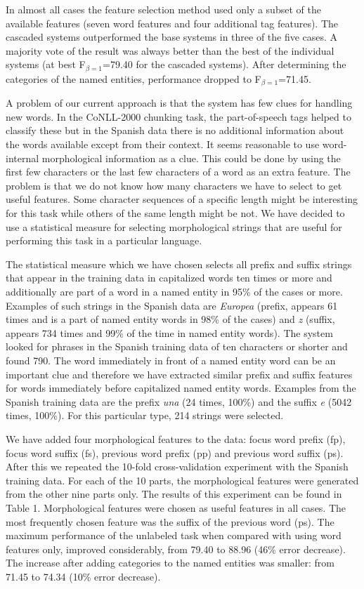 \documentclass[11pt]{article}
\begin{document}
In almost all cases the feature selection method used only a subset of
the available features (seven word features and four additional tag
features).
The cascaded systems outperformed the base systems in three of the
five cases.
A majority vote of the result was always better than the best of the
individual systems (at best F$_{\beta=1}$=79.40 for the cascaded
systems).
After determining the categories of the named entities, performance
dropped to F$_{\beta=1}$=71.45.

A problem of our current approach is that the system has few clues
for handling new words.
In the CoNLL-2000 chunking task, the part-of-speech tags helped to
classify these but in the Spanish data there is no additional
information about the words available except from their context.
It seems reasonable to use word-internal morphological information as
a clue.
This could be done by using the first few characters or the last few
characters of a word as an extra feature.
The problem is that we do not know how many characters we have to
select to get useful features.
Some character sequences of a specific length might be interesting for
this task while others of the same length might be not.
We have decided to use a statistical measure for selecting
morphological strings that are useful for performing this task in a
particular language.

The statistical measure which we have chosen selects all prefix and
suffix strings that appear in the training data in capitalized words
ten times or more and additionally are part of a word in a named
entity in 95\% of the cases or more. 
Examples of such strings in the Spanish data are {\it Europea}
(prefix, appears 61 times and is a part of named entity words in 98\%
of the cases) and {\it z} (suffix, appears 734 times and 99\% of the
time in named entity words).
The system looked for phrases in the Spanish training data of ten
characters or shorter and found 790.
The word immediately in front of a named entity word can be an important
clue and therefore we have extracted similar prefix and suffix
features for words immediately before capitalized named entity words.
Examples from the Spanish training data are the prefix {\it una}
(24 times, 100\%) and the suffix {\it e} (5042 times, 100\%).
For this particular type, 214 strings were selected.

We have added four morphological features to the data: focus word
prefix (fp), focus word suffix (fs), previous word prefix (pp) and
previous word suffix (ps).
After this we repeated the 10-fold cross-validation experiment with
the Spanish training data.
For each of the 10 parts, the morphological features were generated
from the other nine parts only.
The results of this experiment can be found in Table 1.
Morphological features were chosen as useful features in all cases.
The most frequently chosen feature was the suffix of the previous
word (ps).
The maximum performance of the unlabeled task when compared with using
word features only, improved considerably, from 79.40 to 88.96 (46\%
error decrease). 
The increase after adding categories to the named entities was
smaller: from 71.45 to 74.34 (10\% error decrease).
\end{document}
